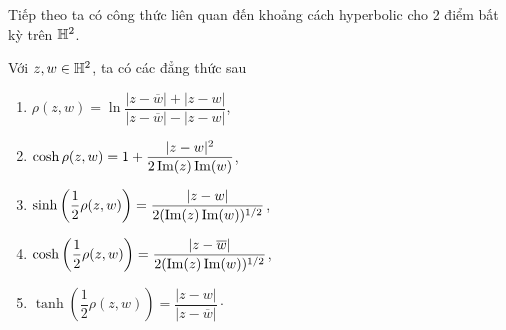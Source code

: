     
Tiếp theo ta có công thức liên quan đến khoảng cách hyperbolic cho 2 điểm bất kỳ trên $\mathbb{H}^2$.
\begin{thm}\label{thm 2.2.4}
    Với $z,w \in \mathbb{H}^2$, ta có các đẳng thức sau
    \begin{enumerate}
        \item $\rho(z,w) = \ln{\dfrac{|z-\overline{w}|+|z-w|}{|z-\overline{w}|-|z-w|}}$,
        \item $\cosh\rho(z,w) = 1 + \dfrac{|z-w|^2}{2\operatorname{Im}(z)\operatorname{Im}(w)}$,
        \item $\sinh\left(\dfrac{1}{2}\rho(z,w)\right) = \dfrac{|z-w|}{2(\operatorname{Im}(z)\operatorname{Im}(w))^{1/2}}$,
        \item $\cosh\left(\dfrac{1}{2}\rho(z,w)\right) = \dfrac{|z-\overline{w}|}{2(\operatorname{Im}(z)\operatorname{Im}(w))^{1/2}}$,
        \item $\tanh\left(\dfrac{1}{2}\rho(z,w)\right) = \dfrac{|z-w|}{|z-\overline{w}|}\cdot$
    \end{enumerate}
\end{thm}
